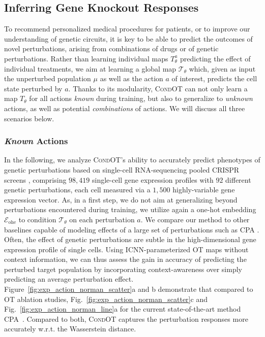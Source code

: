 \subsection{Inferring Gene Knockout Responses}

 To recommend personalized medical procedures for patients, or to improve our understanding of genetic circuits, it is key to be able to predict the outcomes of novel perturbations, arising from combinations of drugs or of genetic perturbations. 
Rather than learning individual maps $T_\theta^a$ predicting the effect of individual treatments, we aim at learning a global map  $\mathcal{T}_\theta$ which, given as input the unperturbed population $\mu$ as well as the action $a$ of interest, predicts the cell state perturbed by $a$.
Thanks to its modularity, \textsc{CondOT} can not only learn a map $T_\theta$ for all actions \emph{known} during training, but also to generalize to \emph{unknown} actions, as well as potential \emph{combinations} of actions. We will discuss all three scenarios below.


\subsubsection{\textit{Known} Actions} \label{sec:eval_action_known}
\vspace{-5pt}

 In the following, we analyze \textsc{CondOT}'s ability to accurately predict phenotypes of genetic perturbations based on single-cell RNA-sequencing pooled CRISPR screens \citep{norman2019exploring, dixit2016perturb}, comprising $98,419$ single-cell gene expression profiles with $92$ different genetic perturbations, each cell measured via a $1,500$ highly-variable gene expression vector.
As, in a first step, we do not aim at generalizing beyond perturbations encountered during training, we utilize again a one-hot embedding $\mathcal{E}_\text{ohe}$ to condition $\mathcal{T}_\theta$ on each perturbation $a$.
We compare our method to other baselines capable of modeling effects of a large set of perturbations such as \textsc{CPA} \citep{lotfollahi2021compositional}.
Often, the effect of genetic perturbations are subtle in the high-dimensional gene expression profile of single cells. Using ICNN-parameterized OT maps without context information, we can thus assess the gain in accuracy of predicting the perturbed target population by incorporating context-awareness over simply predicting an average perturbation effect. 
Figure~\ref{fig:exp_action_norman_scatter}a and b demonstrate that compared to OT ablation studies, Fig.~\ref{fig:exp_action_norman_scatter}c and Fig.~\ref{fig:exp_action_norman_line}a for the current state-of-the-art method \textsc{CPA}~\citep{lotfollahi2021compositional}. Compared to both, \textsc{CondOT} captures the perturbation responses more accurately w.r.t. the Wasserstein distance.

